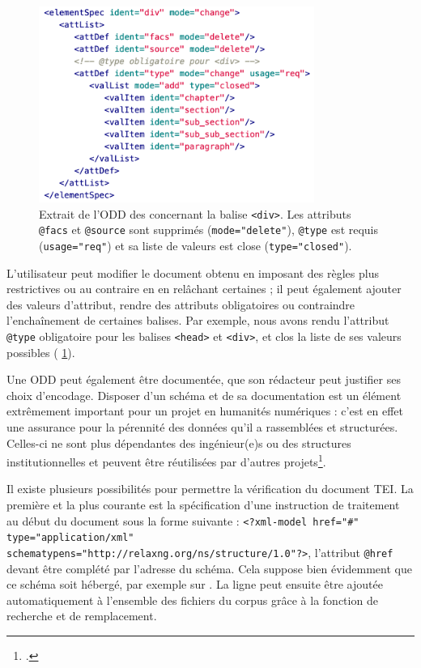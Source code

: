 \begin{figure}[ht]
    \centering
    \includegraphics[width=9cm]{img/odd.png}
    \caption[Extrait de l'ODD concernant la balise \texttt{<div>}]{Extrait de l'ODD des \odm{} concernant la balise \texttt{<div>}. Les attributs \texttt{@facs} et \texttt{@source} sont supprimés (\texttt{mode="delete"}), \texttt{@type} est requis (\texttt{usage="req"}) et sa liste de valeurs est close (\texttt{type="closed"}).}
    \label{fig:tei-odd-rng-ex}
\end{figure}

L'utilisateur peut modifier le document obtenu en imposant des règles plus restrictives ou au contraire en en relâchant certaines ; il peut également ajouter des valeurs d'attribut, rendre des attributs obligatoires ou contraindre l'enchaînement de certaines balises. Par exemple, nous avons rendu l'attribut \texttt{@type} obligatoire pour les balises \texttt{<head>} et \texttt{<div>}, et clos la liste de ses valeurs possibles (\fig{} \ref{fig:tei-odd-rng-ex}).

Une ODD peut également être documentée, \cad{} que son rédacteur peut justifier ses choix d'encodage. Disposer d'un schéma et de sa documentation est un élément extrêmement important pour un projet en humanités numériques : c'est en effet une assurance pour la pérennité des données qu'il a rassemblées et structurées. Celles-ci ne sont plus dépendantes des ingénieur(e)s ou des structures institutionnelles et peuvent être réutilisées par d'autres projets\footcite[p. 61]{jolivet}.

Il existe plusieurs possibilités pour permettre la vérification du document TEI. La première et la plus courante est la spécification d'une instruction de traitement au début du document sous la forme suivante : \texttt{<?xml-model href="\#" type="application/xml" schematypens="http://relaxng.org/ns/structure/1.0"?>}, l'attribut \texttt{@href} devant être complété par l'adresse du schéma. Cela suppose bien évidemment que ce schéma soit hébergé, par exemple sur \gitlab. La ligne peut ensuite être ajoutée automatiquement à l'ensemble des fichiers du corpus grâce à la fonction de recherche et de remplacement.

